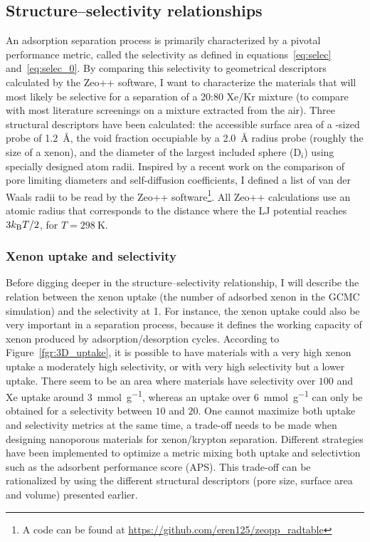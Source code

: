 \documentclass[main.tex]{subfiles}
\begin{document}
\subsection{Structure--selectivity relationships}\label{sct:geometry}

An adsorption separation process is primarily characterized by a pivotal performance metric, called the selectivity as defined in equations~\ref{eq:selec} and~\ref{eq:selec_0}. By comparing this selectivity to geometrical descriptors calculated by the Zeo++ software,\autocite{Zeo++} I want to characterize the materials that will most likely be selective for a separation of a 20:80 Xe/Kr mixture (to compare with most literature screenings on a mixture extracted from the air). Three structural descriptors have been calculated: the accessible surface area of a -sized probe of \SI{1.2}{\angstrom}, the void fraction occupiable by a \SI{2.0}{\angstrom} radius probe (roughly the size of a xenon),\autocite{vol_Ongari2017} and the diameter of the largest included sphere (D$_i$) using specially designed atom radii. Inspired by a recent work on the comparison of pore limiting diameters and self-diffusion coefficients,\autocite{Hung_2021} I defined a list of van der Waals radii to be read by the Zeo++ software\footnote[1]{A code can be found at \url{https://github.com/eren125/zeopp_radtable}}. All Zeo++ calculations use an atomic radius that corresponds to the distance where the LJ potential reaches $3 k_{\text{B}} T/2$, for $T = \SI{298}{\kelvin}$.

\subsubsection{Xenon uptake and selectivity}

Before digging deeper in the structure--selectivity relationship, I will describe the relation between the xenon uptake (the number of adsorbed xenon in the GCMC simulation) and the selectivity at \SI{1}{\atm}. For instance, the xenon uptake could also be very important in a separation process, because it defines the working capacity of xenon produced by adsorption/desorption cycles. According to Figure~\ref{fgr:3D_uptake}, it is possible to have materials with a very high xenon uptake a moderately high selectivity, or with very high selectivity but a lower uptake. There seem to be an area where materials have selectivity over $100$ and Xe uptake around \SI{3}{\milli\mole\per\gram}, whereas an uptake over \SI{6}{\milli\mole\per\gram} can only be obtained for a selectivity between $10$ and $20$. One cannot maximize both uptake and selectivity metrics at the same time, a trade-off needs to be made when designing nanoporous materials for xenon/krypton separation.\autocite{Zhang_2022} Different strategies have been implemented to optimize a metric mixing both uptake and selectivtion such as the adsorbent performance score (APS).\autocite{Solanki_2020}
This trade-off can be rationalized by using the different structural descriptors (pore size, surface area and volume) presented earlier. 
\end{document}
